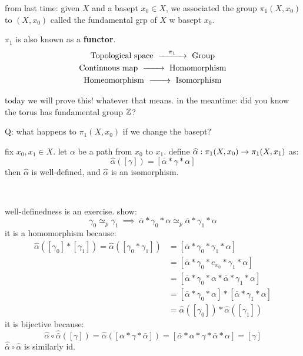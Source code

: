 
from last time: given $X$ and a basept $x_{0}\in X$,
we associated the group $\pi_{1}(X,x_{0})$ to $(X,x_{0})$
called the fundamental grp of $X$ w basept $x_{0}$.

$\pi_{1}$ is also known as a \textbf{functor}.
\begin{gather*}
    \trm{Topological space} \ \xrightarrow{\quad \pi_{1} \quad} \ \trm{Group} \\
    \trm{Continuous map} \ \xrightarrow{\quad \quad} \ \trm{Homomorphism} \\
    \trm{Homeomorphism} \ \xrightarrow{\quad \quad} \ \trm{Isomorphism}
\end{gather*}

today we will prove this! whatever that means.
in the meantime: did you know the torus has fundamental group $\mathbb{Z}$?

Q: what happens to $\pi_{1}(X,x_{0})$ if we change the basept?

\begin{prop}
    fix $x_{0},x_{1}\in X$.
    let $\alpha$ be a path from $x_{0}$ to $x_{1}$.
    define $\widehat{\alpha}:\pi_{1}(X,x_{0})\rightarrow\pi_{1}(X,x_{1})$ as:
    \begin{equation*}
        \hat{\alpha}([\gamma])=[\bar{\alpha}*\gamma*\alpha]
    \end{equation*}
    then $\hat{\alpha}$ is well-defined, and
    $\hat{\alpha}$ is an isomorphism.
\end{prop} \

\begin{pf}[source=Primary Source Material]
    well-definedness is an exercise. show:
    \begin{equation*}
        \gamma_{0}\simeq_{p}\gamma_{1}\ \implies \
        \bar{\alpha}*\gamma_{0}*\alpha\simeq_{p}\bar{\alpha}*\gamma_{1}*\alpha
    \end{equation*}
    it is a homomorphism because:
    \begin{align*}
        \hat{\alpha}([\gamma_{0}]*[\gamma_{1}])
        = \hat{\alpha}([\gamma_{0}*\gamma_{1}])
        & = [\bar{\alpha}*\gamma_{0}*\gamma_{1}*\alpha] \\
        & = [\bar{\alpha}*\gamma_{0}*e_{x_{0}}*\gamma_{1}*\alpha] \\
        & = [\bar{\alpha}*\gamma_{0}*\alpha*\bar{\alpha}*\gamma_{1}*\alpha] \\
        & = [\bar{\alpha}*\gamma_{0}*\alpha]*[\bar{\alpha}*\gamma_{1}*\alpha] \\
        & = \hat{\alpha}([\gamma_{0}])*\hat{\alpha}([\gamma_{1}])
    \end{align*}
    it is bijective because:
    \begin{equation*}
        \hat{\alpha}\circ\hat{\bar{\alpha}}([\gamma])
        = \hat{\alpha}([\alpha*\gamma*\bar{\alpha}])
        = [\bar{\alpha}*\alpha*\gamma*\bar{\alpha}*\alpha]
        = [\gamma]
    \end{equation*}
    $\hat{\bar{\alpha}}\circ\hat{\alpha}$ is similarly id.
\end{pf} \


